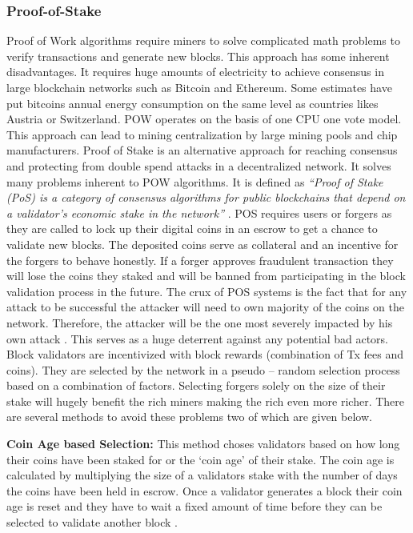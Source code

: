 \subsubsection{Proof-of-Stake} \label{PS}
Proof of Work algorithms require miners to solve complicated math problems to verify transactions and generate new blocks. This approach has some inherent disadvantages. It requires huge amounts of electricity to achieve consensus in large blockchain networks such as Bitcoin and Ethereum. Some estimates have put bitcoins annual energy consumption on the same level as countries likes Austria or Switzerland. POW operates on the basis of one CPU one vote model. This approach can lead to mining centralization by large mining pools and chip manufacturers. Proof of Stake is an alternative approach for reaching consensus and protecting from double spend attacks in a decentralized network. It solves many problems inherent to POW algorithms. It is defined as \textit{“Proof of Stake (PoS) is a category of consensus algorithms for public blockchains that depend on a validator's economic stake in the network”} \cite{ethwiki:006}. POS requires users or forgers as they are called to lock up their digital coins in an escrow to get a chance to validate new blocks. The deposited coins serve as collateral and an incentive for the forgers to behave honestly. If a forger approves fraudulent transaction they will lose the coins they staked and will be banned from participating in the block validation process in the future. The crux of POS systems is the fact that for any attack to be successful the attacker will need to own majority of the coins on the network. Therefore, the attacker will be the one most severely impacted by his own attack \cite{bitwiki:005}. This serves as a huge deterrent against any potential bad actors. Block validators are incentivized with block rewards (combination of Tx fees and coins). They are selected by the network in a pseudo – random selection process based on a combination of factors. Selecting forgers solely on the size of their stake will hugely benefit the rich miners making the rich even more richer. There are several methods to avoid these problems two of which are given below. \cite{medium:002}\cite{misc:001}

\textbf{Coin Age based Selection:}
This method choses validators based on how long their coins have been staked for or the ‘coin age’ of their stake. The coin age is calculated by multiplying the size of a validators stake with the number of days the coins have been held in escrow. Once a validator generates a block their coin age is reset and they have to wait a fixed amount of time before they can be selected to validate another block \cite{misc:001}.

